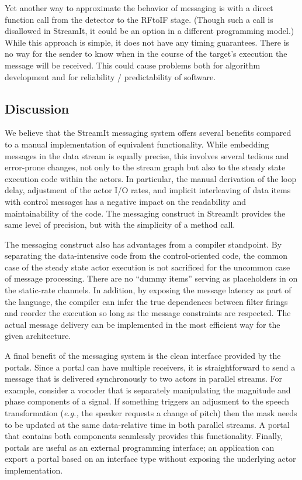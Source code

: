 Yet another way to approximate the behavior of messaging is with a
direct function call from the detector to the RFtoIF stage.  (Though
such a call is disallowed in StreamIt, it could be an option in a
different programming model.)  While this approach is simple, it does
not have any timing guarantees.  There is no way for the sender to
know when in the course of the target's execution the message will be
received.  This could cause problems both for algorithm development
and for reliability / predictability of software.

\subsection{Discussion}

We believe that the StreamIt messaging system offers several benefits
compared to a manual implementation of equivalent functionality.
While embedding messages in the data stream is equally precise, this
involves several tedious and error-prone changes, not only to the
stream graph but also to the steady state execution code within the
actors.  In particular, the manual derivation of the loop delay,
adjustment of the actor I/O rates, and implicit interleaving of data
items with control messages has a negative impact on the readability
and maintainability of the code.  The messaging construct in StreamIt
provides the same level of precision, but with the simplicity of a
method call.

The messaging construct also has advantages from a compiler
standpoint.  By separating the data-intensive code from the
control-oriented code, the common case of the steady state actor
execution is not sacrificed for the uncommon case of message
processing.  There are no ``dummy items'' serving as placeholders in
on the static-rate channels.  In addition, by exposing the message
latency as part of the language, the compiler can infer the true
dependences between filter firings and reorder the execution so long
as the message constraints are respected.  The actual message delivery
can be implemented in the most efficient way for the given
architecture.

A final benefit of the messaging system is the clean interface
provided by the portals.  Since a portal can have multiple receivers,
it is straightforward to send a message that is delivered
synchronously to two actors in parallel streams.  For example,
consider a vocoder that is separately manipulating the magnitude and
phase components of a signal.  If something triggers an adjusment to
the speech transformation ({\it e.g.,} the speaker requests a change
of pitch) then the mask needs to be updated at the same data-relative
time in both parallel streams.  A portal that contains both components
seamlessly provides this functionality.  Finally, portals are useful
as an external programming interface; an application can export a
portal based on an interface type without exposing the underlying
actor implementation.

